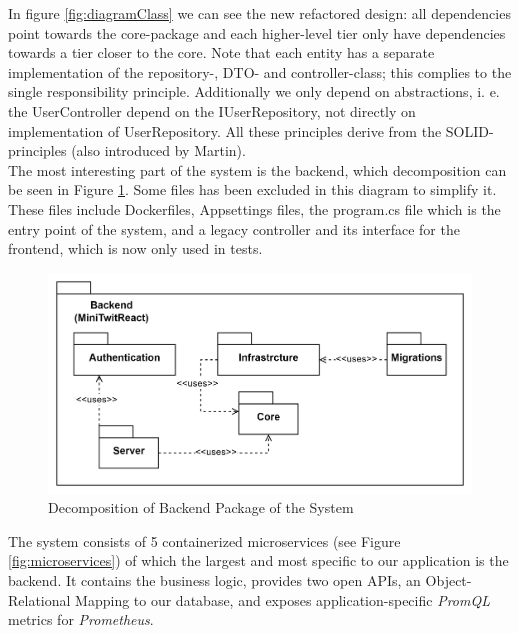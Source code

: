 In figure \ref{fig:diagramClass} we can see the new refactored design: all dependencies point towards the core-package and each higher-level tier only have dependencies towards a tier closer to the core.  Note that each entity has a separate implementation of the repository-, DTO- and controller-class; this complies to the single responsibility principle. Additionally we only depend on abstractions, i. e. the UserController depend on the IUserRepository, not directly on implementation of UserRepository. All these principles derive from the SOLID-principles (also introduced by Martin).\\


The most interesting part of the system is the backend, which decomposition can be seen in Figure \ref{fig:decompositionBackend}.
Some files has been excluded in this diagram to simplify it. 
These files include Dockerfiles, Appsettings files, the program.cs file which is the entry point of the system, and a legacy controller and its interface for the frontend, which is now only used in tests. 

\begin{figure}[H]
    \centering
    \includegraphics[scale=0.18]{images/package_class-diagrams/decomposition_backend.png}
    \caption{Decomposition of Backend Package of the \mini System}
    \label{fig:decompositionBackend}
\end{figure}


The system consists of 5 containerized microservices (see Figure \ref{fig:microservices}) of which the largest and most specific to our application is the \cs backend.
It contains the business logic, provides two open APIs, an Object-Relational Mapping to our database, and exposes application-specific \textit{PromQL} metrics for \textit{Prometheus}. \par

